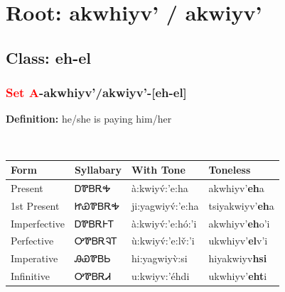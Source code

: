 \needspace{4in}
\section*{Root: akwhiyv' / akwiyv'}
\nopagebreak
{}
\needspace{3in}
\subsection*{Class: eh-el}
\nopagebreak
\needspace{2in}
\subsubsection*{\textcolor{Red}{Set A}{-}\textbf{akwhiyv'/akwiyv'}{-}[eh-el]}
\nopagebreak
\textbf{Definition: } he/she is paying him/her
\\[0.5em]
\begin{tabularx}{\textwidth}{l X X X}%
\toprule%
\textbf{Form}&\textbf{Syllabary}&\textbf{With Tone}&\textbf{Toneless}\\%
\midrule%
Present&ᎠᏈᏴᎡᎭ&à:kwiyv́:’e:ha&akwhiyv'\textbf{eh}a\\%
1st Present&ᏥᏯᏈᏴᎡᎭ&ji:yagwiyv́:’e:ha&tsiyakwiyv'\textbf{eh}a\\%
Imperfective&ᎠᏈᏴᎡᎰᎢ&à:kwiyv́:’e:hó:’i&akwhiyv'\textbf{eh}o'i\\%
Perfective&ᎤᏈᏴᎡᎸᎢ&ù:kwiyv́:’e:lv̌:’i&ukwhiyv'\textbf{el}v'i\\%
Imperative&ᎯᏯᏈᏴᏏ&hi:yagwiyv̀:si&hiyakwiyv\textbf{hsi}\\%
Infinitive&ᎤᏈᏴᎡᏗ&u:kwiyv:’éhdi&ukwhiyv'\textbf{eht}i\\%
\bottomrule%
\end{tabularx}
\\[1em]